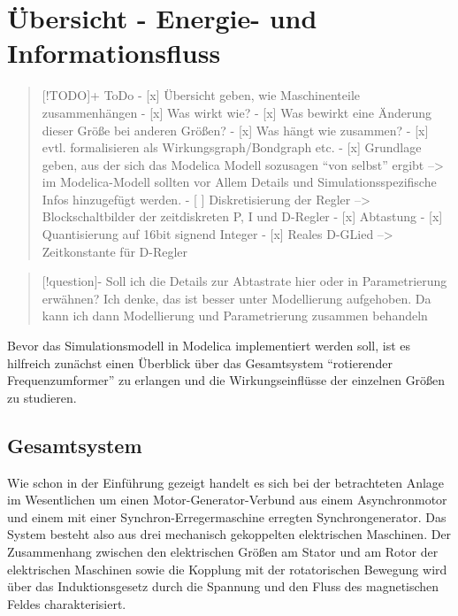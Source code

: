\hypertarget{uxfcbersicht---energie--und-informationsfluss}{%
\section{Übersicht - Energie- und
Informationsfluss}\label{uxfcbersicht---energie--und-informationsfluss}}

\begin{quote}
{[}!TODO{]}+ ToDo - {[}x{]} Übersicht geben, wie Maschinenteile
zusammenhängen - {[}x{]} Was wirkt wie? - {[}x{]} Was bewirkt eine
Änderung dieser Größe bei anderen Größen? - {[}x{]} Was hängt wie
zusammen? - {[}x{]} evtl. formalisieren als Wirkungsgraph/Bondgraph etc.
- {[}x{]} Grundlage geben, aus der sich das Modelica Modell sozusagen
``von selbst'' ergibt --\textgreater{} im Modelica-Modell sollten vor
Allem Details und Simulationsspezifische Infos hinzugefügt werden. - {[}
{]} Diskretisierung der Regler --\textgreater{} Blockschaltbilder der
zeitdiskreten P, I und D-Regler - {[}x{]} Abtastung - {[}x{]}
Quantisierung auf 16bit signend Integer - {[}x{]} Reales D-GLied
--\textgreater{} Zeitkonstante für D-Regler
\end{quote}

\begin{quote}
{[}!question{]}- Soll ich die Details zur Abtastrate hier oder in
Parametrierung erwähnen? Ich denke, das ist besser unter Modellierung
aufgehoben. Da kann ich dann Modellierung und Parametrierung zusammen
behandeln
\end{quote}

Bevor das Simulationsmodell in Modelica implementiert werden soll, ist
es hilfreich zunächst einen Überblick über das Gesamtsystem
``rotierender Frequenzumformer'' zu erlangen und die Wirkungseinflüsse
der einzelnen Größen zu studieren.

\hypertarget{gesamtsystem}{%
\subsection{Gesamtsystem}\label{gesamtsystem}}

Wie schon in der Einführung gezeigt handelt es sich bei der betrachteten
Anlage im Wesentlichen um einen Motor-Generator-Verbund aus einem
Asynchronmotor und einem mit einer Synchron-Erregermaschine erregten
Synchrongenerator. Das System besteht also aus drei mechanisch
gekoppelten elektrischen Maschinen. Der Zusammenhang zwischen den
elektrischen Größen am Stator und am Rotor der elektrischen Maschinen
sowie die Kopplung mit der rotatorischen Bewegung wird über das
Induktionsgesetz durch die Spannung und den Fluss des magnetischen
Feldes charakterisiert.

